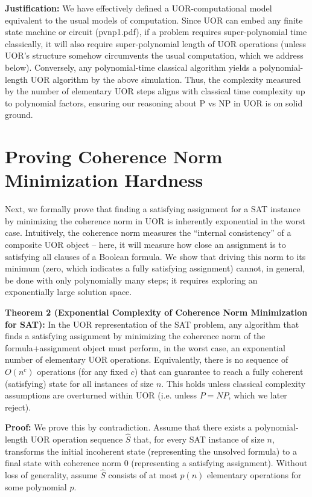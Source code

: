 \documentclass{article}
\begin{document}
\medskip
\textbf{Justification:} We have effectively defined a UOR-computational model equivalent to the usual models of computation. Since UOR can embed any finite state machine or circuit (pvnp1.pdf), if a problem requires super-polynomial time classically, it will also require super-polynomial length of UOR operations (unless UOR’s structure somehow circumvents the usual computation, which we address below). Conversely, any polynomial-time classical algorithm yields a polynomial-length UOR algorithm by the above simulation. Thus, the complexity measured by the number of elementary UOR steps aligns with classical time complexity up to polynomial factors, ensuring our reasoning about P vs NP in UOR is on solid ground.

\section{Proving Coherence Norm Minimization Hardness}

Next, we formally prove that finding a satisfying assignment for a SAT instance by minimizing the coherence norm in UOR is inherently exponential in the worst case. Intuitively, the coherence norm measures the “internal consistency” of a composite UOR object – here, it will measure how close an assignment is to satisfying all clauses of a Boolean formula. We show that driving this norm to its minimum (zero, which indicates a fully satisfying assignment) cannot, in general, be done with only polynomially many steps; it requires exploring an exponentially large solution space.

\medskip
\textbf{Theorem 2 (Exponential Complexity of Coherence Norm Minimization for SAT):} In the UOR representation of the SAT problem, any algorithm that finds a satisfying assignment by minimizing the coherence norm of the formula+assignment object must perform, in the worst case, an exponential number of elementary UOR operations. Equivalently, there is no sequence of $O(n^c)$ operations (for any fixed $c$) that can guarantee to reach a fully coherent (satisfying) state for all instances of size $n$. This holds unless classical complexity assumptions are overturned within UOR (i.e. unless $P=NP$, which we later reject).

\medskip
\textbf{Proof:} We prove this by contradiction. Assume that there exists a polynomial-length UOR operation sequence $\hat{S}$ that, for every SAT instance of size $n$, transforms the initial incoherent state (representing the unsolved formula) to a final state with coherence norm $0$ (representing a satisfying assignment). Without loss of generality, assume $\hat{S}$ consists of at most $p(n)$ elementary operations for some polynomial $p$.
\end{document}
